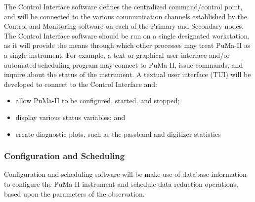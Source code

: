 The Control Interface software defines the centralized command/control
point, and will be connected to the various communication channels
established by the Control and Monitoring software on each of the
Primary and Secondary nodes.  The Control Interface software should be
run on a single designated workstation, as it will provide the means
through which other processes may treat PuMa-II as a single
instrument.  For example, a text or graphical user interface and/or
automated scheduling program may connect to PuMa-II, issue commands,
and inquire about the status of the instrument.  A textual user
interface (TUI) will be developed to connect to the Control Interface
and:
\begin{itemize}
\item allow PuMa-II to be configured, started, and stopped;
\vspace{-2mm}
\item display various status variables; and
\vspace{-2mm}
\item create diagnostic plots, such as the passband and digitizer statistics
\end{itemize}

\subsubsection{Configuration and Scheduling}

Configuration and scheduling software will be make use of database
information to configure the PuMa-II instrument and schedule data
reduction operations, based upon the parameters of the observation.

